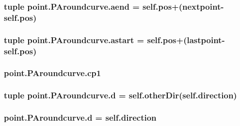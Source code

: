 \subsubsection[{aend}]{\setlength{\rightskip}{0pt plus 5cm}tuple point.\+P\+Aroundcurve.\+aend = self.\+pos+({\bf nextpoint}-\/self.\+pos)\hspace{0.3cm}{\ttfamily [static]}}\label{classpoint_1_1_p_aroundcurve_aae06cb74d805aa35dbd4e47505168e2b}
\hypertarget{classpoint_1_1_p_aroundcurve_a0f9730c4deffcd70cb9f6af6762f09d8}{}
\subsubsection[{astart}]{\setlength{\rightskip}{0pt plus 5cm}tuple point.\+P\+Aroundcurve.\+astart = self.\+pos+({\bf lastpoint}-\/self.\+pos)\hspace{0.3cm}{\ttfamily [static]}}\label{classpoint_1_1_p_aroundcurve_a0f9730c4deffcd70cb9f6af6762f09d8}
\hypertarget{classpoint_1_1_p_aroundcurve_a57f68703c7c964bb2b92dae3002fe7f5}{}
\subsubsection[{cp1}]{\setlength{\rightskip}{0pt plus 5cm}point.\+P\+Aroundcurve.\+cp1}\label{classpoint_1_1_p_aroundcurve_a57f68703c7c964bb2b92dae3002fe7f5}
\hypertarget{classpoint_1_1_p_aroundcurve_af76b1c28fe995c4cdc83bfd822d6480f}{}
\subsubsection[{d}]{\setlength{\rightskip}{0pt plus 5cm}tuple point.\+P\+Aroundcurve.\+d = self.\+other\+Dir(self.\+direction)\hspace{0.3cm}{\ttfamily [static]}}\label{classpoint_1_1_p_aroundcurve_af76b1c28fe995c4cdc83bfd822d6480f}
\hypertarget{classpoint_1_1_p_aroundcurve_ad271346d88ab501f065b6172f3de629d}{}
\subsubsection[{d}]{\setlength{\rightskip}{0pt plus 5cm}point.\+P\+Aroundcurve.\+d = self.\+direction\hspace{0.3cm}{\ttfamily [static]}}\label{classpoint_1_1_p_aroundcurve_ad271346d88ab501f065b6172f3de629d}
\hypertarget{classpoint_1_1_p_aroundcurve_a35548cdf3426f241a2f4dca3c4c07cf4}{}
